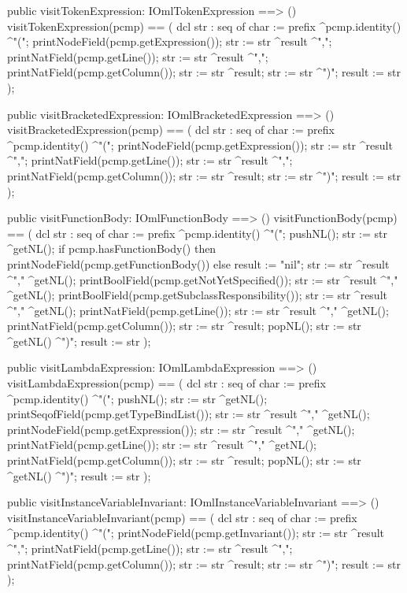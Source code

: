 \begin{vdm_al}
  public visitTokenExpression: IOmlTokenExpression ==> ()
  visitTokenExpression(pcmp) ==
    ( dcl str : seq of char := prefix ^pcmp.identity() ^"(";
      printNodeField(pcmp.getExpression());
      str := str ^result ^",";
      printNatField(pcmp.getLine());
      str := str ^result ^",";
      printNatField(pcmp.getColumn());
      str := str ^result;
      str := str ^")";
      result := str );

  public visitBracketedExpression: IOmlBracketedExpression ==> ()
  visitBracketedExpression(pcmp) ==
    ( dcl str : seq of char := prefix ^pcmp.identity() ^"(";
      printNodeField(pcmp.getExpression());
      str := str ^result ^",";
      printNatField(pcmp.getLine());
      str := str ^result ^",";
      printNatField(pcmp.getColumn());
      str := str ^result;
      str := str ^")";
      result := str );

  public visitFunctionBody: IOmlFunctionBody ==> ()
  visitFunctionBody(pcmp) ==
    ( dcl str : seq of char := prefix ^pcmp.identity() ^"(";
      pushNL();
      str := str ^getNL();
      if pcmp.hasFunctionBody()
      then printNodeField(pcmp.getFunctionBody())
      else result := "nil";
      str := str ^result ^"," ^getNL();
      printBoolField(pcmp.getNotYetSpecified());
      str := str ^result ^"," ^getNL();
      printBoolField(pcmp.getSubclassResponsibility());
      str := str ^result ^"," ^getNL();
      printNatField(pcmp.getLine());
      str := str ^result ^"," ^getNL();
      printNatField(pcmp.getColumn());
      str := str ^result;
      popNL();
      str := str ^getNL() ^")";
      result := str );

  public visitLambdaExpression: IOmlLambdaExpression ==> ()
  visitLambdaExpression(pcmp) ==
    ( dcl str : seq of char := prefix ^pcmp.identity() ^"(";
      pushNL();
      str := str ^getNL();
      printSeqofField(pcmp.getTypeBindList());
      str := str ^result ^"," ^getNL();
      printNodeField(pcmp.getExpression());
      str := str ^result ^"," ^getNL();
      printNatField(pcmp.getLine());
      str := str ^result ^"," ^getNL();
      printNatField(pcmp.getColumn());
      str := str ^result;
      popNL();
      str := str ^getNL() ^")";
      result := str );

  public visitInstanceVariableInvariant: IOmlInstanceVariableInvariant ==> ()
  visitInstanceVariableInvariant(pcmp) ==
    ( dcl str : seq of char := prefix ^pcmp.identity() ^"(";
      printNodeField(pcmp.getInvariant());
      str := str ^result ^",";
      printNatField(pcmp.getLine());
      str := str ^result ^",";
      printNatField(pcmp.getColumn());
      str := str ^result;
      str := str ^")";
      result := str );


\end{vdm_al}
